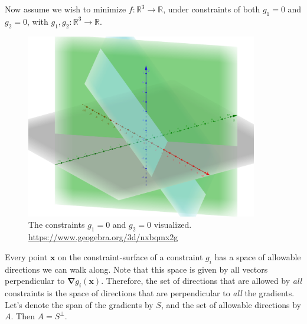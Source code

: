 \documentclass{article}
\begin{document}
\begin{theorem}
Now assume we wish to minimize $f: \mathbb{R}^{3} \to \mathbb{R}$, under constraints of both $g_1 = 0$ and $g_2 = 0$, with $g_1, g_2: \mathbb{R}^{3} \to \mathbb{R}$. 

\begin{figure}[H] \centering \includegraphics[height=0.2\textheight,width=0.9\textwidth,keepaspectratio]{lagrangeMultipleConstraints} \caption{The constraints $g_1 =0$ and $g_2=0$ visualized. \\ \href{https://www.geogebra.org/3d/nxbqmx2g}{https://www.geogebra.org/3d/nxbqmx2g}} \label{fig:lagrangeMultipleConstraints} \end{figure}
Every point $\bm{x}$ on the constraint-surface of a constraint $g_i$ has a space of allowable directions we can walk along. 
Note that this space is given by all vectors perpendicular to $\bm{\nabla}g_i (\bm{x})$. 
Therefore, the set of directions that are allowed by \textit{all} constraints is the space of directions that are perpendicular to \textit{all} the gradients. 
Let's denote the span of the gradients by $S$, and the set of allowable directions by $A$.
Then $A = S^{\perp}$.

\end{theorem}
\end{document}
